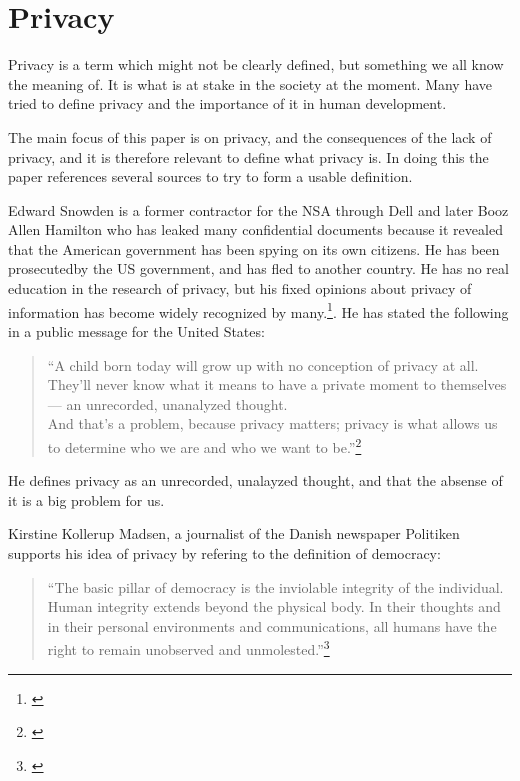 \section{Privacy}
Privacy is a term which might not be clearly defined, but something we all know the meaning of. It is what is at stake in the society at the moment. Many have tried to define privacy and the importance of it in human development.

The main focus of this paper is on privacy, and the consequences of the lack of privacy, and it is therefore relevant to define what privacy is. In doing this the paper references several sources to try to form a usable definition.

Edward Snowden is a former contractor for the NSA through Dell and later Booz Allen Hamilton who has leaked many confidential documents because it revealed that the American government has been spying on its own citizens. He has been prosecutedby the US government, and has fled to another country. He has no real education in the research of privacy, but his fixed opinions about privacy of information has become widely recognized by many.\footnote{\cite{website:edward-snowden-basic}}. He has stated the following in a public message for the United States:

\blockquote{``A child born today will grow up with no conception of privacy at all. They’ll never know what it means to have a private moment to themselves — an unrecorded, unanalyzed thought.\\ And that’s a problem, because privacy matters; privacy is what allows us to determine who we are and who we want to be.''\footnote{\cite{interview:edward-snowden-christmas}}}
He defines privacy as an unrecorded, unalayzed thought, and that the absense of it is a big problem for us.

Kirstine Kollerup Madsen, a journalist of the Danish newspaper Politiken supports his idea of privacy by refering to the definition of democracy:

\blockquote{``The basic pillar of democracy is the inviolable integrity of the individual. Human integrity extends beyond the physical body. In their thoughts and in their personal environments and communications, all humans have the right to remain unobserved and unmolested.''\footnote{\cite{website:a-stand-for-democracy}}}


